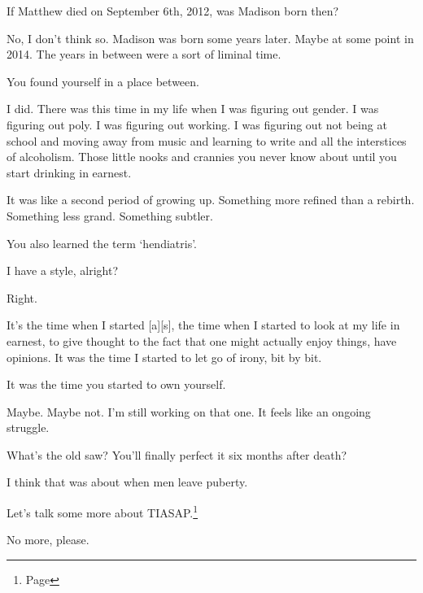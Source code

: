 \label{liminal}
\begin{paracol}{2}
  \begin{leftcolumn}

\begin{ally}
If Matthew died on September 6th, 2012, was Madison born then?
\end{ally}
No, I don't think so. Madison was born some years later. Maybe at some point in 2014. The years in between were a sort of liminal time.

\begin{ally}
You found yourself in a place between.
\end{ally}
I did. There was this time in my life when I was figuring out gender. I was figuring out poly. I was figuring out working. I was figuring out not being at school and moving away from music and learning to write and all the interstices of alcoholism. Those little nooks and crannies you never know about until you start drinking in earnest.

It was like a second period of growing up. Something more refined than a rebirth. Something less grand. Something subtler.

\begin{ally}
You also learned the term `hendiatris'.
\end{ally}
I have a style, alright?

\begin{ally}
Right.
\end{ally}
It's the time when I started {[}a{]}{[}s{]}, the time when I started to look at my life in earnest, to give thought to the fact that one might actually enjoy things, have opinions. It was the time I started to let go of irony, bit by bit.

\begin{ally}
It was the time you started to own yourself.
\end{ally}
Maybe. Maybe not. I'm still working on that one. It feels like an ongoing struggle.

\begin{ally}
What's the old saw? You'll finally perfect it six months after death?
\end{ally}
I think that was about when men leave puberty.

\begin{ally}
Let's talk some more about TIASAP.\footnote{Page \pageref{furry:younes}}
\end{ally}
No more, please.


\end{leftcolumn}
\end{paracol}
